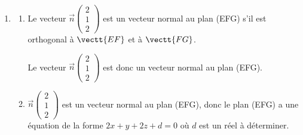 \begin{enumerate}
\begin{enumerate}
$\mathcal{A}=\dfrac{\text{EH}\times \text{FG}}{2}$.		


Donc l'aire du triangle est en cm$^2$: 
$\mathcal{A}= \dfrac{3\sqrt{2}\times 4\sqrt{2}}{2}=12$.

	\end{enumerate}
\item
	\begin{enumerate}
		\item Le vecteur $\vec{n}\begin{pmatrix}2 \\ 1 \\ 2\end{pmatrix}$ est un vecteur normal au plan (EFG) s'il est orthogonal à $\vectt{EF}$ et à $\vectt{FG}$.
		

Le vecteur $\vec{n}\begin{pmatrix}2 \\ 1 \\ 2\end{pmatrix}$ est donc un vecteur normal au plan (EFG).
		\item
$\vec{n}\begin{pmatrix}2 \\ 1 \\ 2\end{pmatrix}$ est  un vecteur normal au plan (EFG), donc le plan (EFG) a une équation de la forme $2x+y+2z+d=0$ où $d$ est un réel à déterminer.


\end{enumerate}
\end{enumerate}
